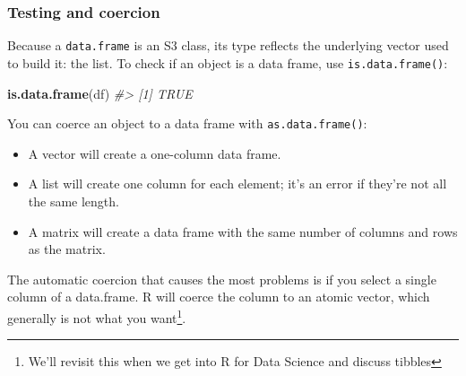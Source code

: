 \documentclass[]{book}
\newenvironment{Shaded}{\begin{snugshade}}{\end{snugshade}}
\newcommand{\CommentTok}[1]{\textcolor[rgb]{0.56,0.35,0.01}{\textit{#1}}}
\newcommand{\DataTypeTok}[1]{\textcolor[rgb]{0.13,0.29,0.53}{#1}}
\newcommand{\KeywordTok}[1]{\textcolor[rgb]{0.13,0.29,0.53}{\textbf{#1}}}
\newcommand{\NormalTok}[1]{#1}
\newcommand{\OtherTok}[1]{\textcolor[rgb]{0.56,0.35,0.01}{#1}}
\newcommand{\StringTok}[1]{\textcolor[rgb]{0.31,0.60,0.02}{#1}}
\let\rmarkdownfootnote\footnote%
\def\footnote{\protect\rmarkdownfootnote}
\theoremstyle{definition}
\theoremstyle{definition}
\theoremstyle{definition}
\theoremstyle{remark}
\begin{document}
\hypertarget{testing-and-coercion}{%
\subsubsection{Testing and coercion}\label{testing-and-coercion}}

Because a \texttt{data.frame} is an S3 class, its type reflects the
underlying vector used to build it: the list. To check if an object is a
data frame, use \texttt{is.data.frame()}:

\begin{Shaded}
\begin{Highlighting}[]
\KeywordTok{is.data.frame}\NormalTok{(df)}
\CommentTok{#> [1] TRUE}
\end{Highlighting}
\end{Shaded}

You can coerce an object to a data frame with \texttt{as.data.frame()}:

\begin{itemize}
\item
  A vector will create a one-column data frame.
\item
  A list will create one column for each element; it's an error if
  they're not all the same length.
\item
  A matrix will create a data frame with the same number of columns and
  rows as the matrix.
\end{itemize}

The automatic coercion that causes the most problems is if you select a
single column of a data.frame. R will coerce the column to an atomic
vector, which generally is not what you want\footnote{We'll revisit this
  when we get into R for Data Science and discuss tibbles}.

\begin{Shaded}
\end{Shaded}
\end{document}
